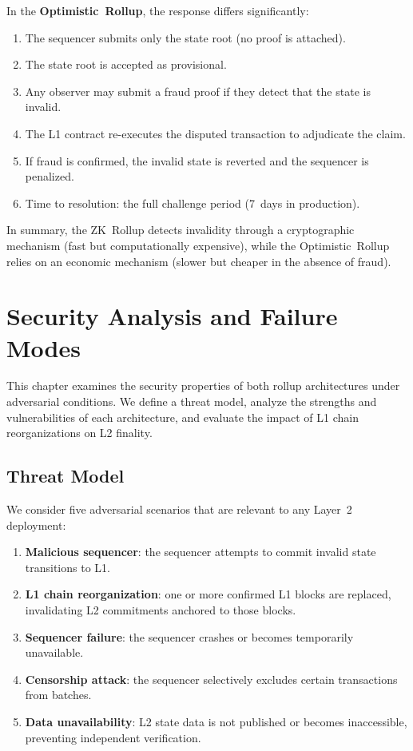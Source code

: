 \documentclass[
]{elteikthesis}[2024/04/26]
\begin{document}
In the \textbf{Optimistic~Rollup}, the response differs significantly:
\begin{enumerate}
    \item The sequencer submits only the state root (no proof is attached).
    \item The state root is accepted as provisional.
    \item Any observer may submit a fraud proof if they detect that the state is invalid.
    \item The L1 contract re-executes the disputed transaction to adjudicate the claim.
    \item If fraud is confirmed, the invalid state is reverted and the sequencer is penalized.
    \item Time to resolution: the full challenge period (7~days in production).
\end{enumerate}

In summary, the ZK~Rollup detects invalidity through a cryptographic mechanism (fast but computationally expensive), while the Optimistic~Rollup relies on an economic mechanism (slower but cheaper in the absence of fraud).

\cleardoublepage

\chapter{Security Analysis and Failure Modes}
\label{ch:security}

This chapter examines the security properties of both rollup architectures under adversarial conditions. We define a threat model, analyze the strengths and vulnerabilities of each architecture, and evaluate the impact of L1 chain reorganizations on L2 finality.

\section{Threat Model}

We consider five adversarial scenarios that are relevant to any Layer~2 deployment:

\begin{enumerate}
    \item \textbf{Malicious sequencer}: the sequencer attempts to commit invalid state transitions to L1.
    \item \textbf{L1 chain reorganization}: one or more confirmed L1 blocks are replaced, invalidating L2 commitments anchored to those blocks.
    \item \textbf{Sequencer failure}: the sequencer crashes or becomes temporarily unavailable.
    \item \textbf{Censorship attack}: the sequencer selectively excludes certain transactions from batches.
    \item \textbf{Data unavailability}: L2 state data is not published or becomes inaccessible, preventing independent verification.
\end{enumerate}
\end{document}
